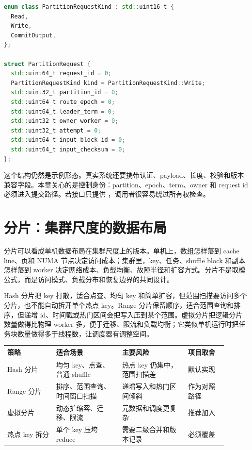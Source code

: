 \begin{lstlisting}[language=C++,caption={分片请求必须携带所有权证据}]
enum class PartitionRequestKind : std::uint16_t {
  Read,
  Write,
  CommitOutput,
};

struct PartitionRequest {
  std::uint64_t request_id = 0;
  PartitionRequestKind kind = PartitionRequestKind::Write;
  std::uint32_t partition_id = 0;
  std::uint64_t route_epoch = 0;
  std::uint64_t leader_term = 0;
  std::uint32_t owner_worker = 0;
  std::uint32_t attempt = 0;
  std::uint64_t input_block_id = 0;
  std::uint64_t input_checksum = 0;
};
\end{lstlisting}

这个结构仍然是示例形态。真实系统还要携带认证、payload、长度、校验和版本兼容字段。本章关心的是控制身份：partition、epoch、term、owner 和 request id 必须进入提交路径。若接口只提供 ，调用者很容易绕过所有权检查。

\section{分片：集群尺度的数据布局}

分片可以看成单机数据布局在集群尺度上的版本。单机上，数组怎样落到 cache line、页和 NUMA 节点决定访问成本；集群里，key、任务、shuffle block 和副本怎样落到 worker 决定网络成本、负载均衡、故障半径和扩容方式。分片不是取模公式，而是访问模式、负载分布和恢复边界的共同设计。

Hash 分片把 key 打散，适合点查、均匀 key 和简单扩容，但范围扫描要访问多个分片，也不能自动拆开单个热点 key。Range 分片保留顺序，适合范围查询和排序，但递增 id、时间戳或热门区间会把写入压到某个范围。虚拟分片把逻辑分片数量做得比物理 worker 多，便于迁移、限流和负载均衡；它类似单机运行时把任务块数量做得多于线程数，让调度器有调整空间。

\begin{center}
\small
\begin{tabular}{@{}p{0.20\linewidth}p{0.27\linewidth}p{0.27\linewidth}p{0.16\linewidth}@{}}
\toprule
策略 & 适合场景 & 主要风险 & 项目取舍 \\
\midrule
Hash 分片 & 均匀 key、点查、普通 shuffle & 热点 key 仍集中，范围扫描差 & 默认实现 \\
Range 分片 & 排序、范围查询、时间窗口扫描 & 递增写入和热门区间倾斜 & 作为对照路径 \\
虚拟分片 & 动态扩缩容、迁移、限流 & 元数据和调度更复杂 & 推荐加入 \\
热点 key 拆分 & 单个 key 压垮 reduce & 需要二级合并和版本记录 & 必须覆盖 \\
\bottomrule
\end{tabular}
\end{center}

